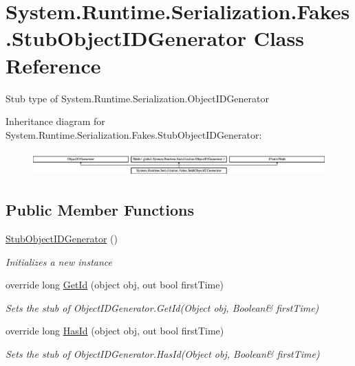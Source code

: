 \hypertarget{class_system_1_1_runtime_1_1_serialization_1_1_fakes_1_1_stub_object_i_d_generator}{\section{System.\-Runtime.\-Serialization.\-Fakes.\-Stub\-Object\-I\-D\-Generator Class Reference}
\label{class_system_1_1_runtime_1_1_serialization_1_1_fakes_1_1_stub_object_i_d_generator}
}


Stub type of System.\-Runtime.\-Serialization.\-Object\-I\-D\-Generator 


Inheritance diagram for System.\-Runtime.\-Serialization.\-Fakes.\-Stub\-Object\-I\-D\-Generator\-:\begin{figure}[H]
\begin{center}
\leavevmode
\includegraphics[height=0.979877cm]{class_system_1_1_runtime_1_1_serialization_1_1_fakes_1_1_stub_object_i_d_generator}
\end{center}
\end{figure}
\subsection*{Public Member Functions}
\begin{DoxyCompactItemize}
\item 
\hyperlink{class_system_1_1_runtime_1_1_serialization_1_1_fakes_1_1_stub_object_i_d_generator_ac052424bb42e947b2c8c2877c5e6e243}{Stub\-Object\-I\-D\-Generator} ()
\begin{DoxyCompactList}\small\item\em Initializes a new instance\end{DoxyCompactList}\item 
override long \hyperlink{class_system_1_1_runtime_1_1_serialization_1_1_fakes_1_1_stub_object_i_d_generator_a68456fd288f73d2488cdaad542cea469}{Get\-Id} (object obj, out bool first\-Time)
\begin{DoxyCompactList}\small\item\em Sets the stub of Object\-I\-D\-Generator.\-Get\-Id(Object obj, Boolean\& first\-Time)\end{DoxyCompactList}\item 
override long \hyperlink{class_system_1_1_runtime_1_1_serialization_1_1_fakes_1_1_stub_object_i_d_generator_aa2a5a298a4405429be1c605ec9d87fb3}{Has\-Id} (object obj, out bool first\-Time)
\begin{DoxyCompactList}\small\item\em Sets the stub of Object\-I\-D\-Generator.\-Has\-Id(Object obj, Boolean\& first\-Time)\end{DoxyCompactList}\end{DoxyCompactItemize}
